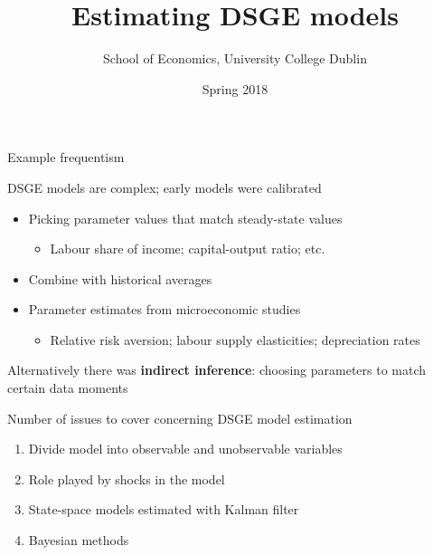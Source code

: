 \documentclass{beamer}
\title{Estimating DSGE models}
\author{School of Economics, University College Dublin}
\date{Spring 2018}
\begin{document}
\begin{frame}
 \titlepage
\end{frame}

\begin{frame}
 Example frequentism
\end{frame}


\begin{frame}
 DSGE models are complex; early models were calibrated
 \begin{itemize}
     \item Picking parameter values that match steady-state values
     \begin{itemize}
       \item Labour share of income; capital-output ratio; etc. 
     \end{itemize}
     \item Combine with historical averages
     \item Parameter estimates from microeconomic studies 
     \begin{itemize}
       \item Relative risk aversion; labour supply elasticities; depreciation rates
     \end{itemize}
   \end{itemize}  
   \medskip
   Alternatively there was \textbf{indirect inference}: choosing parameters to match certain data moments
\end{frame}

\begin{frame}
  Number of issues to cover concerning DSGE model estimation\medskip  
\begin{enumerate}
  \item Divide model into observable and unobservable variables
  \item Role played by shocks in the model
  \item State-space models estimated with Kalman filter
  \item Bayesian methods
\end{enumerate}
\end{frame}
\end{document}
